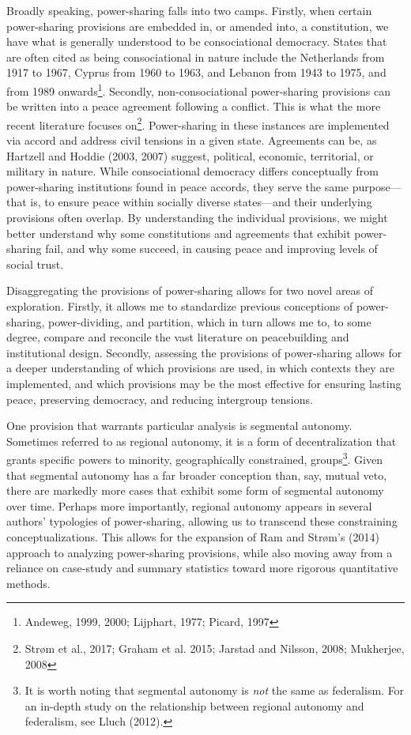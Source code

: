 \documentclass[12pt]{article}
\begin{document}
Broadly speaking, power-sharing falls into two camps. Firstly, when certain power-sharing provisions are embedded in, or amended into, a constitution, we have what is generally understood to be consociational democracy. States that are often cited as being consociational in nature include the Netherlands from 1917 to 1967, Cyprus from 1960 to 1963, and Lebanon from 1943 to 1975, and from 1989 onwards\footnote{Andeweg, 1999, 2000; Lijphart, 1977; Picard, 1997}. Secondly, non-consociational power-sharing provisions can be written into a peace agreement following a conflict. This is what the more recent literature focuses on\footnote{Strøm et al., 2017; Graham et al. 2015; Jarstad and Nilsson, 2008; Mukherjee, 2008}. Power-sharing in these instances are implemented via accord and address civil tensions in a given state. Agreements can be, as Hartzell and Hoddie (2003, 2007) suggest, political, economic, territorial, or military in nature. While consociational democracy differs conceptually from power-sharing institutions found in peace accords, they serve the same purpose---that is, to ensure peace within socially diverse states---and their underlying provisions often overlap. By understanding the individual provisions, we might better understand why some constitutions and agreements that exhibit power-sharing fail, and why some succeed, in causing peace and improving levels of social trust. 

Disaggregating the provisions of power-sharing allows for two novel areas of exploration. Firstly, it allows me to standardize previous conceptions of power-sharing, power-dividing, and partition, which in turn allows me to, to some degree, compare and reconcile the vast literature on peacebuilding and institutional design. Secondly, assessing the provisions of power-sharing allows for a deeper understanding of which provisions are used, in which contexts they are implemented, and which provisions may be the most effective for ensuring lasting peace, preserving democracy, and reducing intergroup tensions. 

One provision that warrants particular analysis is segmental autonomy. Sometimes referred to as regional autonomy, it is a form of decentralization that grants specific powers to minority, geographically constrained, groups\footnote{It is worth noting that segmental autonomy is \textit{not} the same as federalism. For an in-depth study on the relationship between regional autonomy and federalism, see Lluch (2012).}. Given that segmental autonomy has a far broader conception than, say, mutual veto, there are markedly more cases that exhibit some form of segmental autonomy over time. Perhaps more importantly, regional autonomy appears in several authors' typologies of power-sharing, allowing us to transcend these constraining conceptualizations. This allows for the expansion of Ram and Strøm’s (2014) approach to analyzing power-sharing provisions, while also moving away from a reliance on case-study and summary statistics toward more rigorous quantitative methods.
\end{document}
